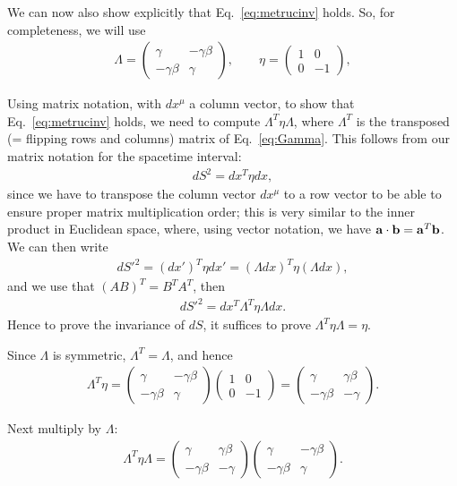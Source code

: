 \documentclass[12pt]{article}
\newcommand{\be}{\begin{eqnarray}}
\newcommand{\ee}{\end{eqnarray}}
\begin{document}
We can now also show explicitly that Eq.~\eqref{eq:metrucinv} holds. So, for completeness, we will use 
\be
\Lambda = 
\begin{pmatrix}
\gamma & -\gamma\beta \\[4pt]
-\gamma\beta & \gamma
\end{pmatrix},
\qquad
\eta =
\begin{pmatrix}
1 & 0 \\[4pt]
0 & -1
\end{pmatrix},
\ee

Using matrix notation, with $dx^{\mu}$ a column vector, to show that Eq.~\eqref{eq:metrucinv} holds, we need to compute $\Lambda^{T}\eta\Lambda$, where $\Lambda^T$ is the transposed (= flipping rows and columns) matrix of Eq.~\eqref{eq:Gamma}. This follows from our matrix notation for the spacetime interval:
\be
dS^2 = dx^T \eta dx, 
\ee
since we have to transpose the column vector $dx^{\mu}$ to a row vector to be able to ensure proper matrix multiplication order; this is very similar to the inner product in Euclidean space, where, using vector notation, we have ${\bf a} \cdot {\bf b} = {\bf a}^T {\bf b}$. We can then write 
\be
dS'^2 = (dx')^T\eta dx'  = (\Lambda dx)^T \eta (\Lambda dx), 
\ee
and we use that $(AB)^T = B^TA^T$, then
\be
dS'^2  = dx^T \Lambda^T \eta \Lambda dx.
\ee
Hence to prove the invariance of $dS$, it suffices to prove $\Lambda^{T}\eta\Lambda = \eta$. 

Since $\Lambda$ is symmetric, $\Lambda^{T} = \Lambda$, and hence
\be
\Lambda^{T}\eta =
\begin{pmatrix}
\gamma & -\gamma\beta \\[4pt]
-\gamma\beta & \gamma
\end{pmatrix}
\begin{pmatrix}
1 & 0 \\[4pt]
0 & -1
\end{pmatrix}
=
\begin{pmatrix}
\gamma & \gamma\beta \\[4pt]
-\gamma\beta & -\gamma
\end{pmatrix}.
\ee

Next multiply by $\Lambda$:
\be
\Lambda^{T}\eta\Lambda
=
\begin{pmatrix}
\gamma & \gamma\beta \\[4pt]
-\gamma\beta & -\gamma
\end{pmatrix}
\begin{pmatrix}
\gamma & -\gamma\beta \\[4pt]
-\gamma\beta & \gamma
\end{pmatrix}.
\ee
\end{document}
